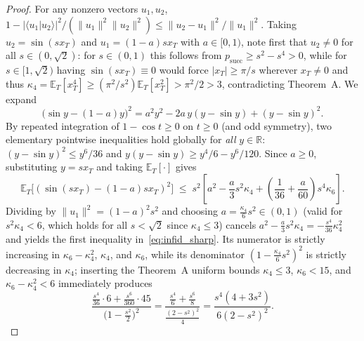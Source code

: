 \documentclass[11pt,a4paper]{article}
\theoremstyle{remark}
\newcommand{\braket}[2]{\langle #1 \vert #2 \rangle}
\newcommand{\E}{\mathbb{E}}
\begin{document}
\begin{proof}
For any nonzero vectors $u_1, u_2$, $1 - |\braket{u_1}{u_2}|^2/(\|u_1\|^2\|u_2\|^2) \le \|u_2 - u_1\|^2/\|u_1\|^2$. Taking $u_2 = \sin(s x_T)$ and $u_1 = (1 - a) s x_T$ with $a \in [0, 1)$, note first that $u_2 \neq 0$ for all $s \in (0, \sqrt{2})$: for $s \in (0, 1)$ this follows from $p_{\mathrm{succ}} \ge s^2 - s^4 > 0$, while for $s \in [1, \sqrt{2})$ having $\sin(s x_T) \equiv 0$ would force $|x_T| \ge \pi/s$ wherever $x_T \neq 0$ and thus $\kappa_4 = \E_T[x_T^4] \ge (\pi^2/s^2)\E_T[x_T^2] > \pi^2/2 > 3$, contradicting Theorem~A. We expand
\begin{equation}
\bigl(\sin y - (1 - a) y\bigr)^2 = a^2 y^2 - 2 a\, y(y - \sin y) + (y - \sin y)^2.
\end{equation}
By repeated integration of $1 - \cos t \ge 0$ on $t \ge 0$ (and odd symmetry), two elementary pointwise inequalities hold globally for \emph{all} $y \in \mathbb{R}$: $(y - \sin y)^2 \le y^6/36$ and $y(y - \sin y) \ge y^4/6 - y^6/120$. Since $a \ge 0$, substituting $y = s x_T$ and taking $\E_T[\cdot]$ gives
\begin{equation}
\E_T\bigl[(\sin(s x_T) - (1-a) s x_T)^2\bigr] \;\le\; s^2\!\left[a^2 - \frac{a}{3} s^2 \kappa_4 + \left(\frac{1}{36} + \frac{a}{60}\right) s^4 \kappa_6\right].
\end{equation}
Dividing by $\|u_1\|^2 = (1 - a)^2 s^2$ and choosing $a = \frac{\kappa_4}{6} s^2 \in (0, 1)$ (valid for $s^2 \kappa_4 < 6$, which holds for all $s < \sqrt{2}$ since $\kappa_4 \le 3$) cancels $a^2 - \frac{a}{3} s^2 \kappa_4 = -\frac{s^4}{36}\kappa_4^2$ and yields the first inequality in~\eqref{eq:infid_sharp}. Its numerator is strictly increasing in $\kappa_6 - \kappa_4^2$, $\kappa_4$, and $\kappa_6$, while its denominator $(1 - \frac{\kappa_4}{6} s^2)^2$ is strictly decreasing in $\kappa_4$; inserting the Theorem~A uniform bounds $\kappa_4 \le 3$, $\kappa_6 < 15$, and $\kappa_6 - \kappa_4^2 < 6$ immediately produces
\begin{equation}
\frac{\frac{s^4}{36}\cdot 6 + \frac{s^6}{360}\cdot 45}{\bigl(1 - \frac{s^2}{2}\bigr)^2}
= \frac{\frac{s^4}{6} + \frac{s^6}{8}}{\frac{(2 - s^2)^2}{4}}
= \frac{s^4(4 + 3s^2)}{6(2 - s^2)^2}.
\end{equation}


\end{proof}
\end{document}
